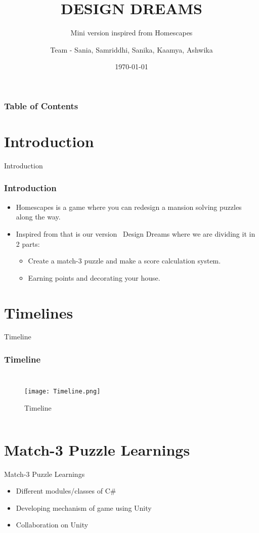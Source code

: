 \documentclass[10pt]{beamer}
\title[TECH TITANS]{DESIGN DREAMS}
\subtitle{ Mini version inspired from Homescapes}
\author[Team - Sania, Samriddhi, Sanika, Kaamya, Ashwika]{Team - Sania, Samriddhi, Sanika, Kaamya, Ashwika}
\institute[]{Project Progress Presentation}
\date[\textcolor{white}{\today} ]
{\today}
\begin{document}
\frame{\titlepage}
\begin{frame}
\frametitle{Table of Contents}
\tableofcontents
\end{frame}

\section{Introduction}
    \begin{frame}{Introduction}
    \frametitle{Introduction}
        \begin{itemize}
            \item Homescapes is a game where you can redesign a mansion solving puzzles along the way.
            \item Inspired from that is our version~ Design Dreams where we are dividing it in 2 parts:
        \begin{itemize}
            \item  Create a match-3 puzzle and make a score calculation system.

            \item  Earning points and decorating your house.
        \end{itemize}
        \end{itemize}
    \end{frame}
\section{Timelines}
\begin{frame}{Timeline}
    \frametitle{Timeline}
    \begin{columns}
        \begin{figure}
        \texttt{[image: Timeline.png]}
        \caption{Timeline}
        \end{figure}
       
    
    \end{columns}
\end{frame}
\section{Match-3 Puzzle Learnings}
    \begin{frame}{Match-3 Puzzle Learnings}
     \begin{itemize}
        \item Different modules/classes of C\#
        \item Developing mechanism of game using Unity
        \item Collaboration on Unity
      \end{itemize}  
    \end{frame}
\end{document}
